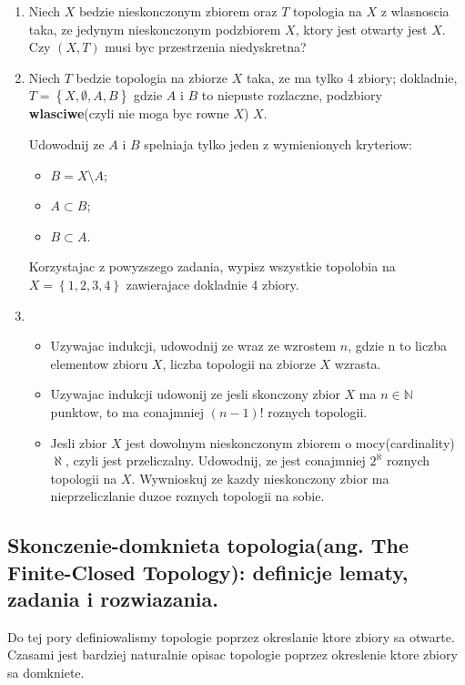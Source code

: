 \documentclass{article}
\begin{document}
\begin{enumerate}
\item Niech $X$ bedzie nieskonczonym zbiorem oraz $T$ topologia na $X$ z wlasnoscia taka, ze jedynym nieskonczonym podzbiorem $X$, ktory jest otwarty jest $X$. Czy $(X, T)$ musi byc przestrzenia niedyskretna?
\item Niech $T$ bedzie topologia na zbiorze $X$ taka, ze ma tylko 4 zbiory; dokladnie, $T = \left\{ X, \emptyset, A, B \right\}$ gdzie $A$ i $B$ to niepuste rozlaczne, podzbiory \textbf{wlasciwe}(czyli nie moga byc rowne $X$) $X$.

Udowodnij ze $A$ i $B$ spelniaja tylko jeden z wymienionych kryteriow:
\begin{itemize}
    \item $B = X \setminus A$;
    \item $A \subset B$;
    \item $B \subset A$.
\end{itemize}

Korzystajac z powyzszego zadania, wypisz wszystkie topolobia na $X = \left\{ 1,2,3,4 \right\}$ zawierajace dokladnie 4 zbiory.

\item
    \begin{itemize}
        \item Uzywajac indukcji, udowodnij ze wraz ze wzrostem $n$, gdzie n to liczba elementow zbioru $X$, liczba topologii na zbiorze $X$ wzrasta.
        \item Uzywajac indukcji udowonij ze jesli skonczony zbior $X$ ma $n \in \mathbb{N}$ punktow, to ma conajmniej $(n-1)!$ roznych topologii.
        \item Jesli zbior $X$ jest dowolnym nieskonczonym zbiorem o mocy(cardinality) $\aleph$, czyli jest przeliczalny. Udowodnij, ze jest conajmniej $2^{\aleph}$ roznych topologii na $X$. Wywnioskuj ze kazdy nieskonczony zbior ma nieprzeliczlanie duzoe roznych topologii na sobie.
    \end{itemize}
\end{enumerate}%
\subsection{Skonczenie-domknieta topologia(ang. The Finite-Closed Topology): definicje lematy, zadania i rozwiazania.}

Do tej pory definiowalismy topologie poprzez okreslanie ktore zbiory sa otwarte. Czasami jest bardziej naturalnie opisac topologie poprzez okreslenie ktore zbiory sa domkniete. 
\end{document}

